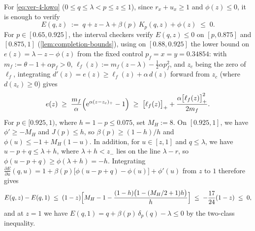 \documentclass[11pt]{article}
\numberwithin{equation}{section}
\theoremstyle{plain}
\theoremstyle{definition}
\newcommand{\1}{\mathbf{1}}
\begin{document}
For \cref{eq:ver-4-lowq} ($0 \le q \le \lambda < p \le z \le 1$), since $r_x + u_x \ge 1$ and $\phi(z) \le 0$, it is enough to verify
\[
  E(q, z) \;:=\; q + z - \lambda + \beta(p)\,K_p(q, z) + \phi(z) \;\le\; 0.
\]
For $p \in [0.65, 0.925]$, the interval checkers verify $E(q, z) \le 0$ on $[p, 0.875]$ and $[0.875, 1]$ (\cref{lem:completion-bounds}), using on $[0.88, 0.925]$ the lower bound on $e(z) = \lambda - z - \phi(z)$ from the fixed control $p_f = x = y = 0.34854$: with $m_f := \theta - 1 + \alpha p_f > 0$, $\ell_f(z) := m_f(z - \lambda) - \frac{1}{2}\alpha p_f^2$, and $z_c$ being the zero of $\ell_f$, integrating $d'(z) = e(z) \ge \ell_f(z) + \alpha\,d(z)$ forward from $z_c$ (where $d(z_c) \ge 0$) gives
\begin{equation}
  e(z) \;\ge\; \frac{m_f}{\alpha}\Bigl(\mathrm{e}^{\alpha(z - z_c)_+} - 1\Bigr) \;\ge\; \bigl[\ell_f(z)\bigr]_+ + \frac{\alpha\bigl[\ell_f(z)\bigr]_+^2}{2m_f}.
  \label{eq:e-z-lower-bound}
\end{equation}
For $p \in [0.925, 1)$, where $h = 1 - p \le 0.075$, set $M_H := 8$. On $[0.925, 1]$, we have $\phi' \ge -M_H$ and $J(p) \le h$, so $\beta(p) \ge (1 - h)/h$ and $\phi(u) \le -1 + M_H(1 - u)$. In addition, for $u \in [z, 1]$ and $q \le \lambda$, we have $u - p + q \le \lambda + h$, where $\lambda + h < z_-$ lies on the line $\lambda - r$, so $\phi(u - p + q) \ge \phi(\lambda + h) = -h$. Integrating $\frac{\partial E}{\partial u}(q, u) = 1 + \beta(p)\bigl[\phi(u - p + q) - \phi(u)\bigr] + \phi'(u)$ from $z$ to $1$ therefore gives
\begin{equation}
  E(q, z) - E(q, 1) \;\le\; (1 - z)\Bigl[M_H - 1 - \frac{(1 - h)\bigl(1 - (M_H/2 + 1)h\bigr)}{h}\Bigr] \;\le\; -\frac{17}{24}(1 - z) \;\le\; 0,
  \label{eq:near-one-analytic}
\end{equation}
and at $z = 1$ we have $E(q, 1) = q + \beta(p)\,\delta_p(q) - \lambda \le 0$ by the two-class inequality.
\end{document}
